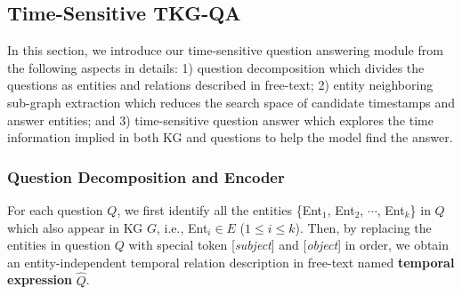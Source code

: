 \documentclass[11pt]{article}
\newcommand{\gt}[1]{{{\textcolor{cyan}{[gt: #1]}}}}
\begin{document}
\subsection{Time-Sensitive TKG-QA}

In this section, we introduce our time-sensitive question answering module from the following aspects in details: 1) question decomposition which divides the questions as entities and relations described in free-text; 2) entity neighboring sub-graph extraction which reduces the search space of candidate timestamps and answer entities; and 3) time-sensitive question answer which explores the time information implied in both KG and questions to help the model find the answer.

\begin{comment}
In this section, a multi-step temporal QA framework is proposed for temporal reasoning.
To answer a temporal question, multiple steps are needed including limiting the scope of candidates to identify the exact answer, understanding the temporal expression, locating the occurrence time, and then finding the answers. 
Importantly, a model that has the sensitiveness of the temporal expressions and their nuanced difference of time expressions (e.g., before and after) will be important for answering the questions.
\end{comment}

\subsubsection{Question Decomposition and Encoder}
\label{sec3_5}

For each question $Q$, we first identify all the entities \{Ent$_1$, Ent$_2$, $\cdots$, Ent$_k$\} in $Q$ which also appear in KG $G$, i.e., Ent$_i \in E$ ($1\leq i \leq k$).
Then, by replacing the entities in question $Q$ with special token [\textit{subject}] and [\textit{object}] in order, we obtain an entity-independent temporal relation description in free-text named \textbf{temporal expression} $\hat{Q}$.
\end{document}
